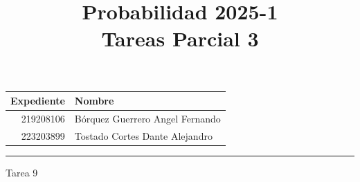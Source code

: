 \documentclass[a4paper, 12pt]{article}
\title
{
    Probabilidad 2025-1 \\
    Tareas Parcial 3
    }
\begin{document}
    \maketitle

    \begin{center}
        \begin{tabular}{r|l}
            \textbf{Expediente} & \textbf{Nombre} \\ \hline
            219208106 & Bórquez Guerrero Angel Fernando \\
            223203899 & Tostado Cortes Dante Alejandro \\
        \end{tabular}
    \end{center}

    \rule{\linewidth}{0.3mm}



    \vspace{0.3cm}

    \begin{center}
        { \LARGE Tarea 9}
    \end{center}
\end{document}
